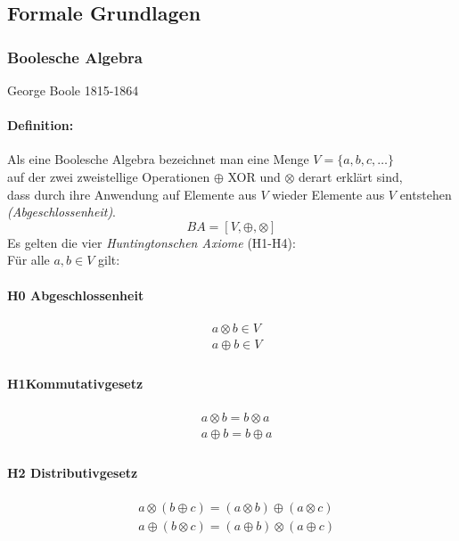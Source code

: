 \documentclass[a4paper]{scrartcl}
\begin{document}
		\subsection{Formale Grundlagen}
			\subsubsection{Boolesche Algebra}
				George Boole 1815-1864\\
				
				\paragraph{Definition:}
				Als eine Boolesche Algebra bezeichnet man eine Menge \( V = \{ a,b,c, \dots \} \)\\
				auf der zwei zweistellige Operationen \(  \oplus \) XOR und \( \otimes \) derart erklärt sind,\\
				dass durch ihre Anwendung auf Elemente aus \( V \) wieder Elemente aus \( V \) entstehen \emph{(Abgeschlossenheit)}.\\
				\[ BA = [V, \oplus , \otimes ] \]
				Es gelten die vier \emph{Huntingtonschen Axiome} (H1-H4):\\
					Für alle \( a,b \in V \) gilt:\\
				\paragraph{H0 Abgeschlossenheit}
				\begin{align*}
					&a \otimes b \in V\\
					&a \oplus b \in V\\
				\end{align*}
				
				\paragraph{H1Kommutativgesetz}
				\begin{align*}
					&a \otimes b = b \otimes a\\
					&a \oplus b = b \oplus a \\
				\end{align*}
				
				\paragraph{H2 Distributivgesetz}
				\begin{align*}
					& a \otimes (b \oplus c) = (a \otimes b) \oplus (a \otimes c)\\
					& a \oplus (b \otimes c) = (a \oplus b) \otimes (a \oplus c)\\
				\end{align*}
				
\end{document}
